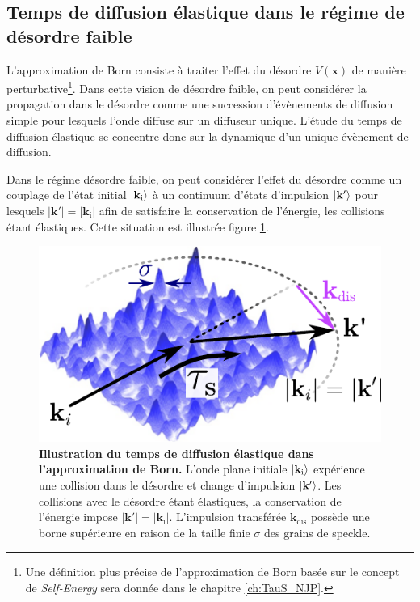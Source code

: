 \subsection{Temps de diffusion élastique dans le régime de désordre faible}
L'approximation de Born consiste à traiter l'effet du désordre $V(\mathbf{x})$ de manière perturbative\footnote{Une définition plus précise de l'approximation de Born basée sur le concept de \emph{Self-Energy} sera donnée dans le chapitre \ref{ch:TauS_NJP}.}.  Dans cette vision de désordre faible, on peut considérer la propagation dans le désordre comme une succession d'évènements de diffusion simple pour lesquels l'onde diffuse sur un diffuseur unique. L'étude du temps de diffusion élastique se concentre donc sur la dynamique d'un unique évènement de diffusion.



Dans le régime désordre faible, on peut considérer l'effet du désordre comme un couplage de l'état initial $\left| \mathbf{k}_{\mathrm{i}} \right\rangle$ à un continuum d'états d'impulsion $\left| \mathbf{k}' \right\rangle$ pour lesquels $\left| \mathbf{k}' \right| = \left| \mathbf{k}_{\mathrm{i}} \right| $ afin de satisfaire la conservation de l'énergie, les collisions étant élastiques. Cette situation est illustrée figure \ref{fig:illustration_contexte_taus}. 

\begin{figure}
\centering
\includegraphics[scale=1]{Fig/TauS_PRL/illustration_contexte_taus.pdf}
\caption{\textbf{Illustration du temps de diffusion élastique dans l'approximation de Born.} L'onde plane initiale $\left| \mathbf{k}_{\mathrm{i}} \right\rangle$ expérience une collision dans le désordre et change d'impulsion $\left| \mathbf{k}' \right\rangle$. Les collisions avec le désordre étant élastiques, la conservation de l'énergie impose $\left|\mathbf{k}'\right|=\left|\mathbf{k}_{\mathrm{i}}\right|$. L'impulsion transférée $\mathbf{k}_{\mathrm{dis}}$ possède une borne supérieure en raison de la taille finie $\sigma$ des grains de speckle.}
\label{fig:illustration_contexte_taus}
\end{figure}


